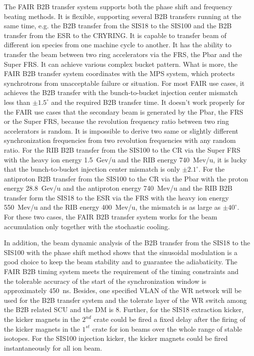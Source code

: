 The FAIR B2B transfer system supports both the phase shift and frequency beating methods. It is flexible, supporting several B2B transfers running at the same time, e.g. the B2B transfer from the SIS18 to the SIS100 and the B2B transfer from the ESR to the CRYRING. It is capable to transfer beam of different ion species from one machine cycle to another. It has the ability to transfer the beam between two ring accelerators via the FRS, the Pbar and the Super FRS. It can achieve various complex bucket pattern. What is more, the FAIR B2B transfer system coordinates with the MPS system, which protects synchrotrons from unacceptable failure or situation. For most FAIR use cases, it achieves the B2B transfer with the bunch-to-bucket injection center mismatch less than $\pm1.5^\circ$ and the required B2B transfer time. It doesn't work properly for the FAIR use cases that the secondary beam is generated by the Pbar, the FRS or the Super FRS, because the revolution frequency ratio between two ring accelerators is random. It is impossible to derive two same or slightly different synchronization frequencies from two revolution frequencies with any random ratio. For the RIB B2B transfer from the SIS100 to the CR via the Super FRS with the heavy ion energy \SI{1.5}{Gev/u} and the RIB energy \SI{740}{Mev/u}, it is lucky that the bunch-to-bucket injection center mismatch is only $\pm2.1^\circ$. For the antiproton B2B transfer from the SIS100 to the CR via the Pbar with the proton energy \SI{28.8}{Gev/u} and the antiproton energy \SI{740}{Mev/u} and the RIB B2B transfer form the SIS18 to the ESR via the FRS with the heavy ion energy \SI{550}{Mev/u} and the RIB energy \SI{400}{Mev/u}, the mismatch is as large as $\pm40^\circ$. For these two cases, the FAIR B2B transfer system works for the beam accumulation only together with the stochastic cooling.  

In addition, the beam dynamic analysis of the B2B transfer from the SIS18 to the SIS100 with the phase shift method shows that the sinusoidal modulation is a good choice to keep the beam stability and to guarantee the adiabaticity. The FAIR B2B timing system meets the requirement of the timing constraints and the tolerable accuracy of the start of the synchronization window is approximately \SI{450}{\ns}. Besides, one specified VLAN of the WR network will be used for the B2B transfer system and the tolerate layer of the WR switch among the B2B related SCU and the DM is 8.  Further, for the SIS18 extraction kicker, the kicker magnets in the $2^{nd}$ crate could be fired a fixed delay after the firing of the kicker magnets in the $1^{st}$ crate for ion beams over the whole range of stable isotopes. For the SIS100 injection kicker, the kicker magnets could be fired instantaneously for all ion beam. 

